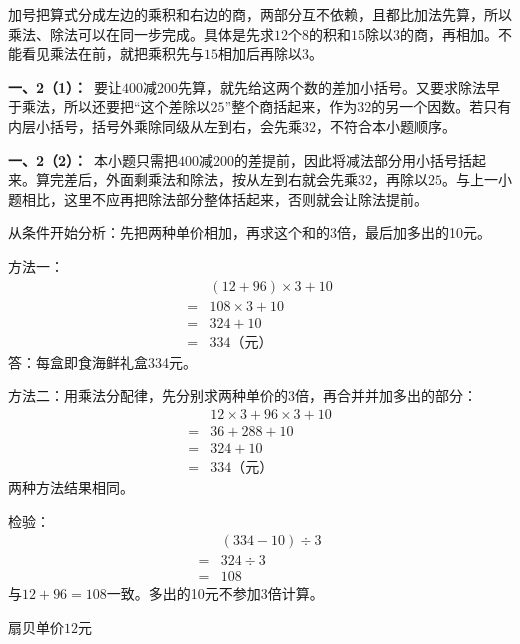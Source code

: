 \documentclass[multi=snippet,border=0pt]{standalone}
\newenvironment{snippet}[3]{\begin{minipage}{#1bp}\color{answerred}\fontsize{#2}{#3}\selectfont\raggedright}{\end{minipage}}
\begin{document}
\begin{snippet}{505}{11.5}{14}加号把算式分成左边的乘积和右边的商，两部分互不依赖，且都比加法先算，所以乘法、除法可以在同一步完成。具体是先求\(12\)个\(8\)的积和\(15\)除以\(3\)的商，再相加。不能看见乘法在前，就把乘积先与\(15\)相加后再除以\(3\)。\end{snippet}
\begin{snippet}{505}{11.5}{14}\textbf{一、2（1）：}\ 要让\(400\)减\(200\)先算，就先给这两个数的差加小括号。又要求除法早于乘法，所以还要把“这个差除以\(25\)”整个商括起来，作为\(32\)的另一个因数。若只有内层小括号，括号外乘除同级从左到右，会先乘\(32\)，不符合本小题顺序。\end{snippet}
\begin{snippet}{505}{11.5}{14}\textbf{一、2（2）：}\ 本小题只需把\(400\)减\(200\)的差提前，因此将减法部分用小括号括起来。算完差后，外面剩乘法和除法，按从左到右就会先乘\(32\)，再除以\(25\)。与上一小题相比，这里不应再把除法部分整体括起来，否则就会让除法提前。\end{snippet}
\begin{snippet}{505}{11.5}{14}从条件开始分析：先把两种单价相加，再求这个和的3倍，最后加多出的10元。\par 方法一：\[\begin{aligned}&(12+96)\times3+10\\={}&108\times3+10\\={}&324+10\\={}&334\text{（元）}\end{aligned}\]答：每盒即食海鲜礼盒334元。\par 方法二：用乘法分配律，先分别求两种单价的3倍，再合并并加多出的部分：\[\begin{aligned}&12\times3+96\times3+10\\={}&36+288+10\\={}&324+10\\={}&334\text{（元）}\end{aligned}\]两种方法结果相同。\par 检验：\[\begin{aligned}&(334-10)\div3\\={}&324\div3\\={}&108\end{aligned}\]与\(12+96=108\)一致。多出的10元不参加3倍计算。\end{snippet}
\begin{snippet}{55.549999999999955}{7.5}{12.8}扇贝单价\(12\)元\end{snippet}
\end{document}
